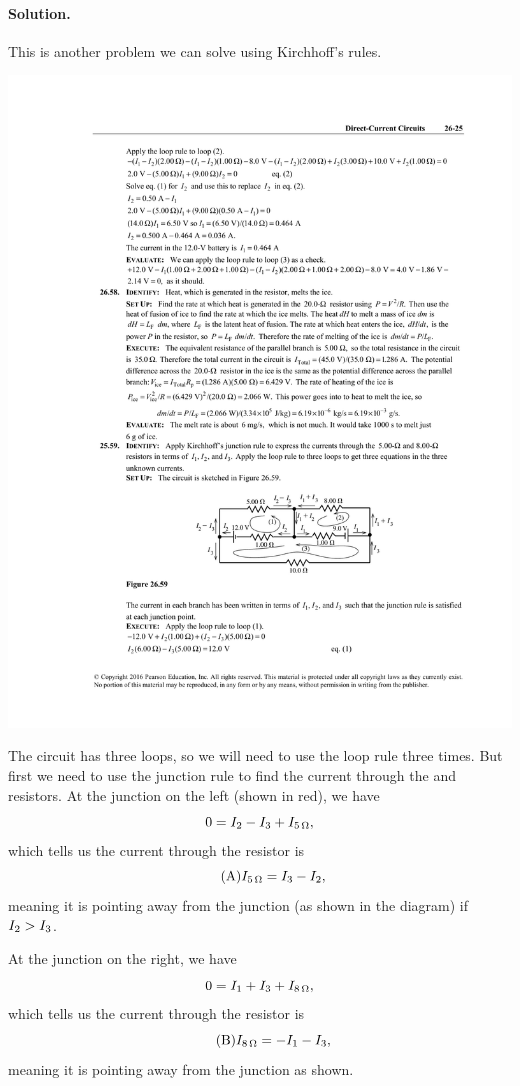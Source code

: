\documentclass[11pt]{article}
\newcommand{\beq}{\begin{equation*}}
\newcommand{\eeq}{\end{equation*}}
\newcommand{\beqn}{\begin{equation}}
\newcommand{\eeqn}{\end{equation}}
\newenvironment{solution}
{
    \paragraph{Solution.}
    \ignorespaces
}
{
    \bigskip
}
\begin{document}
\begin{solution}
	This is another problem we can solve using Kirchhoff's rules.
	
	\begin{center}
		\includegraphics{A26-59}
	\end{center}
	
		The circuit has three loops, so we will need to use the loop rule three times.  But first we need to use the junction rule to find the current through the  and  resistors.  At the junction on the left (shown in red), we have
	\beq
		0 = \Iw - \Ie + I_{\Sohm{5}},
	\eeq
	which tells us the current through the  resistor is
	\beqn \tag{A}
		I_{\Sohm{5}} = \Ie - \Iw,
	\eeqn
	meaning it is pointing away from the junction (as shown in the diagram) if $I_2 > I_3$.
	
	At the junction on the right, we have
	\beq
		0 = \Iq + \Ie + I_{\Sohm{8}},
	\eeq
	which tells us the current through the  resistor is
	\beqn \tag{B}
		I_{\Sohm{8}} = -\Iq - \Ie,
	\eeqn
	meaning it is pointing away from the junction as shown.
	

\end{solution}
\end{document}
